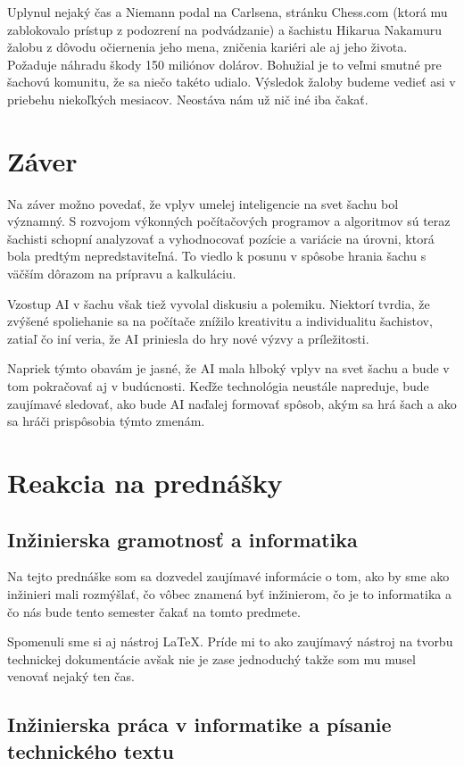 \documentclass[10pt,oneside,slovak,a4paper]{article}
\begin{document}
Uplynul nejaký čas a Niemann podal na Carlsena, stránku Chess.com (ktorá mu zablokovalo prístup z podozrení na podvádzanie) a šachistu Hikarua Nakamuru žalobu z dôvodu očiernenia jeho mena, zničenia kariéri ale aj jeho života. Požaduje náhradu škody 150 miliónov dolárov. Bohužial je to veľmi smutné pre šachovú komunitu, že sa niečo takéto udialo. Výsledok žaloby budeme vedieť asi v priebehu niekoľkých mesiacov. Neostáva nám už nič iné iba čakať.


\section{Záver}

Na záver možno povedať, že vplyv umelej inteligencie na svet šachu bol významný. S rozvojom výkonných počítačových programov a algoritmov sú teraz šachisti schopní analyzovať a vyhodnocovať pozície a variácie na úrovni, ktorá bola predtým nepredstaviteľná. To viedlo k posunu v spôsobe hrania šachu s väčším dôrazom na prípravu a kalkuláciu.

Vzostup AI v šachu však tiež vyvolal diskusiu a polemiku. Niektorí tvrdia, že zvýšené spoliehanie sa na počítače znížilo kreativitu a individualitu šachistov, zatiaľ čo iní veria, že AI priniesla do hry nové výzvy a príležitosti.

Napriek týmto obavám je jasné, že AI mala hlboký vplyv na svet šachu a bude v tom pokračovať aj v budúcnosti. Keďže technológia neustále napreduje, bude zaujímavé sledovať, ako bude AI naďalej formovať spôsob, akým sa hrá šach a ako sa hráči prispôsobia týmto zmenám.

\section{Reakcia na prednášky}
\subsection{Inžinierska gramotnosť a informatika}

Na tejto prednáške som sa dozvedel zaujímavé informácie o tom, ako by sme ako inžinieri mali rozmýšlať, čo vôbec znamená byť inžinierom, čo je to informatika a čo nás bude tento semester čakať na tomto predmete.

Spomenuli sme si aj nástroj LaTeX. Príde mi to ako zaujímavý nástroj na tvorbu technickej dokumentácie avšak nie je zase jednoduchý takže som mu musel venovať nejaký ten čas.


\subsection{Inžinierska práca v informatike a písanie technického textu}
\end{document}
